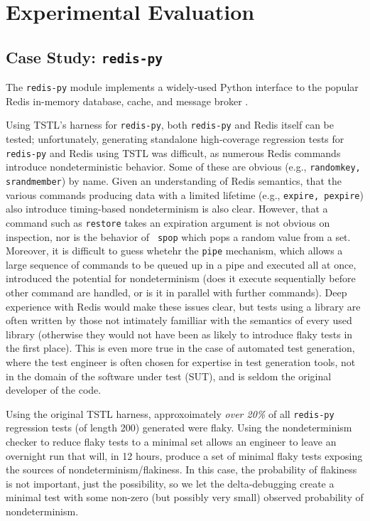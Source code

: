 \section{Experimental Evaluation}

\subsection {Case Study: {\tt redis-py}}

The {\tt redis-py} \cite{redispy} module implements a widely-used Python interface
to the popular Redis in-memory database, cache, and
message broker \cite{redis}.

Using TSTL's harness for {\tt redis-py}, both {\tt redis-py} and Redis
itself can be tested; unfortunately, generating standalone
high-coverage regression tests for {\tt redis-py} and Redis using TSTL
was difficult, as numerous Redis commands introduce nondeterministic
behavior.  Some of these are obvious (e.g., {\tt randomkey, srandmember}) by
name.  Given an understanding of Redis semantics, that the various
commands producing data with a limited lifetime (e.g., {\tt expire,
  pexpire}) also introduce timing-based nondeterminism is also clear.
However, that a command such as {\tt restore} takes an expiration
argument is not obvious on inspection, nor is the behavior of {\tt
  spop} which pops a random value from a set.  Moreover, it is
difficult to guess whetehr the {\tt pipe} mechanism, which allows a
large sequence of commands to be queued up in a pipe and executed all
at once, introduced the potential for nondeterminism (does it execute
sequentially before other command are handled, or is it in parallel
with further commands).  Deep experience with Redis would make these
issues clear, but tests using a library are often written by those not
intimately familliar with the semantics of every used library (otherwise they would not have
been as likely to introduce flaky tests in the first place).  This is
even more true in the case of automated test generation, where the
test engineer is often chosen for expertise in test generation tools,
not in the domain of the software under test (SUT), and is seldom the
original developer of the code.

Using the original TSTL harness, approxoimately \emph{over 20\%} of all {\tt redis-py}
regression tests (of length 200) generated were flaky.  Using the
nondeterminism checker to reduce flaky tests to a minimal set allows
an engineer to leave an overnight run that will, in 12 hours, produce
a set of minimal flaky tests exposing the sources of
nondeterminism/flakiness.  In this case, the probability of flakiness
is not important, just the possibility, so we let the delta-debugging
create a minimal test with some non-zero (but possibly very small)
observed probability of nondeterminism.  

